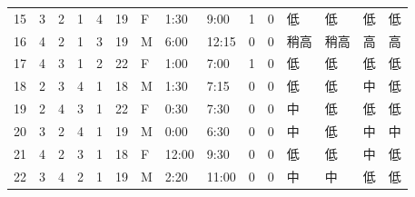\begin{table}[htbp]
{\begin{tabular}{lllllllllllllll}
15                  & 3                      & 2                       & 1                      & 4                       & 19                     & F                   & 1:30                  & 9:00                  & 1                    & 0                    & 低       & 低       & 低    & 低  \\
16                  & 4                      & 2                       & 1                      & 3                       & 19                     & M                   & 6:00                  & 12:15                 & 0                    & 0                    & 稍高      & 稍高      & 高    & 高  \\
17                  & 4                      & 3                       & 1                      & 2                       & 22                     & F                   & 1:00                  & 7:00                  & 1                    & 0                    & 低       & 低       & 低    & 低  \\
18                  & 2                      & 3                       & 4                      & 1                       & 18                     & M                   & 1:30                  & 7:15                  & 0                    & 0                    & 低       & 低       & 中    & 低  \\
19                  & 2                      & 4                       & 3                      & 1                       & 22                     & F                   & 0:30                  & 7:30                  & 0                    & 0                    & 中       & 低       & 低    & 低  \\
20                  & 3                      & 2                       & 4                      & 1                       & 19                     & M                   & 0:00                  & 6:30                  & 0                    & 0                    & 中       & 低       & 中    & 中  \\
21                  & 4                      & 2                       & 3                      & 1                       & 18                     & F                   & 12:00                 & 9:30                  & 0                    & 0                    & 低       & 低       & 中    & 低  \\
22                  & 3                      & 4                       & 2                      & 1                       & 19                     & M                   & 2:20                  & 11:00                 & 0                    & 0                    & 中       & 中       & 低    & 低  \\

\end{tabular}}
\end{table}
